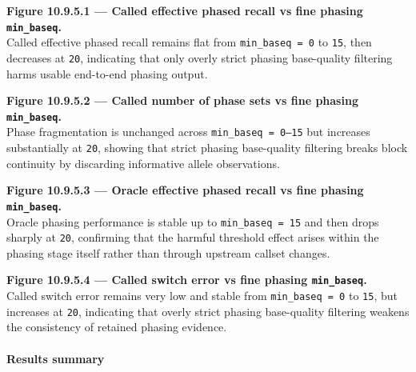 \documentclass[
]{article}
\begin{document}
\textbf{Figure 10.9.5.1 --- Called effective phased recall vs fine
phasing \texttt{min\_baseq}.}\\
Called effective phased recall remains flat from
\texttt{min\_baseq\ =\ 0} to \texttt{15}, then decreases at \texttt{20},
indicating that only overly strict phasing base-quality filtering harms
usable end-to-end phasing output.

\textbf{Figure 10.9.5.2 --- Called number of phase sets vs fine phasing
\texttt{min\_baseq}.}\\
Phase fragmentation is unchanged across \texttt{min\_baseq\ =\ 0–15} but
increases substantially at \texttt{20}, showing that strict phasing
base-quality filtering breaks block continuity by discarding informative
allele observations.

\textbf{Figure 10.9.5.3 --- Oracle effective phased recall vs fine
phasing \texttt{min\_baseq}.}\\
Oracle phasing performance is stable up to \texttt{min\_baseq\ =\ 15}
and then drops sharply at \texttt{20}, confirming that the harmful
threshold effect arises within the phasing stage itself rather than
through upstream callset changes.

\textbf{Figure 10.9.5.4 --- Called switch error vs fine phasing
\texttt{min\_baseq}.}\\
Called switch error remains very low and stable from
\texttt{min\_baseq\ =\ 0} to \texttt{15}, but increases at \texttt{20},
indicating that overly strict phasing base-quality filtering weakens the
consistency of retained phasing evidence.

\paragraph{Results summary}\label{results-summary-4}
\end{document}
